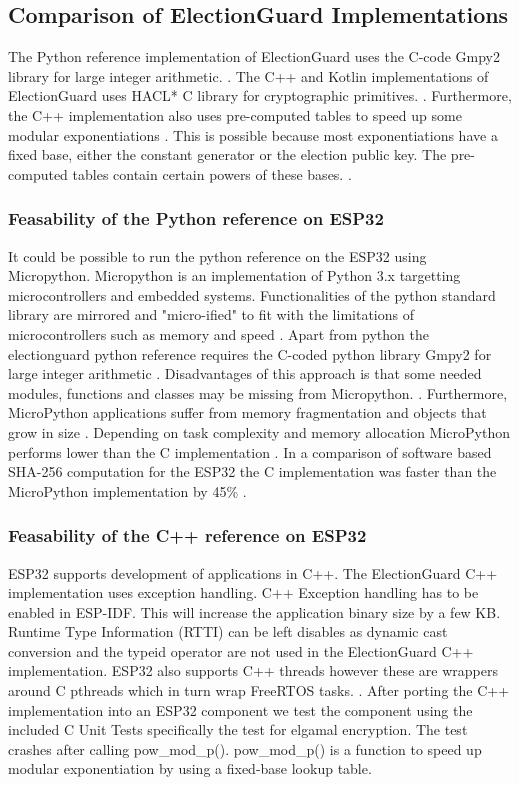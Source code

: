 \subsection{Comparison of ElectionGuard Implementations}
 The Python reference implementation of ElectionGuard uses the C-code Gmpy2 library for large integer arithmetic. \cite{eg-docs}. \cite{esp32-ref} The C++ and Kotlin implementations of ElectionGuard uses HACL* C library for cryptographic primitives. \cite{eg-docs}. Furthermore, the C++ implementation also uses pre-computed tables to speed up some modular exponentiations \cite{eg-docs}. This is possible because most exponentiations have a fixed base, either the constant generator or the election public key. The pre-computed tables contain certain powers of these bases. \cite{eg-docs}.

\subsubsection{Feasability of the Python reference on ESP32}
It could be possible to run the python reference on the ESP32 using Micropython. Micropython is an implementation of Python 3.x targetting microcontrollers and embedded systems. Functionalities of the python standard library are mirrored and "micro-ified" to fit with the limitations of microcontrollers such as memory and speed \cite{micropython} \cite[234]{micropython-performance}. Apart from python the electionguard python reference requires the C-coded python library Gmpy2 for large integer arithmetic \cite{eg-ref}. Disadvantages of this approach is that some needed modules, functions and classes may be missing from Micropython. \cite{micropython}. Furthermore, MicroPython applications suffer from memory fragmentation and objects that grow in size \cite[234]{micropython-performance}. Depending on task complexity and memory allocation MicroPython performs lower than the C implementation \cite[237]{micropython-performance}. In a comparison of software based SHA-256 computation for the ESP32 the C implementation was faster than the MicroPython implementation by 45\% \cite[237]{micropython-performance}. 

\subsubsection{Feasability of the C++ reference on ESP32}
ESP32 supports development of applications in C++. The ElectionGuard C++ implementation uses exception handling. C++ Exception handling has to be enabled in ESP-IDF. This will increase the application binary size by a few KB. Runtime Type Information (RTTI) can be left disables as dynamic cast conversion and the typeid operator are not used in the ElectionGuard C++ implementation. ESP32 also supports C++ threads however these are wrappers around C pthreads which in turn wrap FreeRTOS tasks. \cite{esp-prog}. After porting the C++ implementation into an ESP32 component we test the component using the included C Unit Tests specifically the test for elgamal encryption. The test crashes after calling pow_mod_p(). pow_mod_p() is a function to speed up modular exponentiation by using a fixed-base lookup table. 


